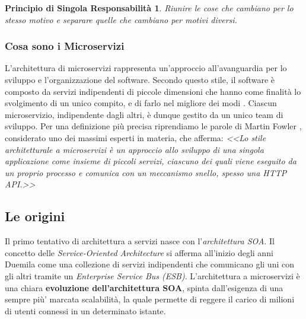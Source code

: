 \newtheorem*{defin1}{Principio di Singola Responsabilità}
\begin{defin1}
    Riunire le cose che cambiano per lo stesso motivo e separare quelle che cambiano per motivi diversi.
\end{defin1}

\subsubsection{Cosa sono i Microservizi}
L'architettura di microservizi rappresenta un'approccio all'avanguardia per lo sviluppo e l'organizzazione del software. Secondo questo stile, il software è composto da servizi indipendenti di piccole dimensioni che hanno come finalità lo svolgimento di un unico compito, e di farlo nel migliore dei modi \cite{amazon:microservices}. Ciascun microservizio, indipendente dagli altri, è dunque gestito da un unico team di sviluppo. Per una definizione più precisa riprendiamo le parole di Martin Fowler \cite{fowler:microservices}, considerato uno dei massimi esperti in materia, che afferma: \textit{<<Lo stile architetturale a microservizi è un approccio allo sviluppo di una singola applicazione come insieme di piccoli servizi, ciascuno dei quali viene eseguito da un proprio processo e comunica con un meccanismo snello, spesso una HTTP API.>>} 

\subsection{Le origini}
Il primo tentativo di architettura a servizi nasce con l’\textit{architettura SOA}. Il concetto delle \textit{Service-Oriented Architecture} si afferma all’inizio degli anni Duemila come una collezione di servizi indipendenti che comunicano gli uni con gli altri tramite un \textit{Enterprise Service Bus (ESB)}. L’architettura a microservizi è una chiara \textbf{evoluzione dell’architettura SOA}, spinta dall’esigenza  di una sempre più’ marcata scalabilità, la quale permette di reggere il carico di milioni di utenti connessi in un determinato istante.

